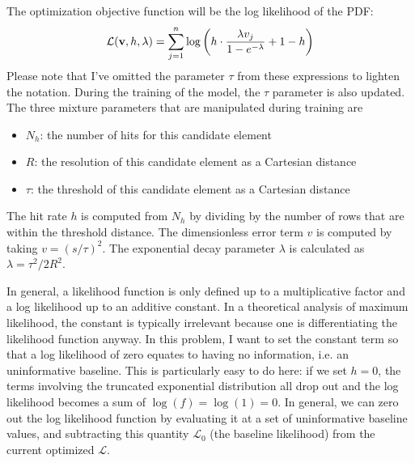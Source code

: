 The optimization objective function will be the log likelihood of the PDF:
$$ \mathcal{L}(\mathbf{v}, h, \lambda) = \sum_{j=1}^{n} \log \left( h \cdot \frac{\lambda v_j}{1 - e^{-\lambda}} + 1 - h \right)$$
Please note that I've omitted the parameter $\tau$ from these expressions to lighten the notation.
During the training of the model, the $\tau$ parameter is also updated.
The three mixture parameters that are manipulated during training are 
\begin{itemize}
\item $N_h$: the number of hits for this candidate element
\item $R$: the resolution of this candidate element as a Cartesian distance
\item $\tau$: the threshold of this candidate element as a Cartesian distance
\end{itemize}
The hit rate $h$ is computed from $N_h$ by dividing by the number of rows that are within the threshold distance.
The dimensionless error term $v$ is computed by taking $v = (s/\tau)^2$.
The exponential decay parameter $\lambda$ is calculated as $\lambda = \tau^2 / 2R^2$.

In general, a likelihood function is only defined up to a multiplicative factor and a log likelihood up to an additive constant.
In a theoretical analysis of maximum likelihood, the constant is typically irrelevant because one is differentiating the likelihood function anyway.
In this problem, I want to set the constant term so that a log likelihood of zero equates to having no information,
i.e. an uninformative baseline.
This is particularly easy to do here: if we set $h=0$, the terms involving the truncated exponential distribution all drop out 
and the log likelihood becomes a sum of $\log(f) = \log(1) = 0$.
In general, we can zero out the log likelihood function by evaluating it at a set of uninformative baseline values, 
and subtracting this quantity $\mathcal{L}_0$ (the baseline likelihood) from the current optimized $\mathcal{L}$.

